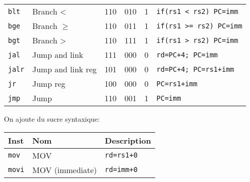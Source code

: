 \documentclass[a4paper]{article}
\begin{document}
\begin{longtable}{|l|l|c|c|c|l|}
        \texttt{blt}   & Branch <                        & 110    & 010    & 1      & \texttt{if(rs1 < rs2) PC=imm} \\
        \texttt{bge}   & Branch \(\geqslant\)            & 110    & 011    & 1      & \texttt{if(rs1 >= rs2) PC=imm}\\
        \texttt{bgt}   & Branch >                        & 110    & 111    & 1      & \texttt{if(rs1 > rs2) PC=imm} \\
        \hline
        \texttt{jal}   & Jump and link                   & 111    & 000    & 0      &\texttt{rd=PC+4; PC=imm}         \\
        \texttt{jalr}  & Jump and link reg               & 101    & 000    & 0      &\texttt{rd=PC+4; PC=rs1+imm}     \\
        \texttt{jr}    & Jump reg                        & 100    & 000    & 0      &\texttt{PC=rs1+imm}            \\
        \texttt{jmp}   & Jump                            & 110    & 001    & 1      &\texttt{PC=imm}                \\
        \hline
    \end{longtable}

    On ajoute du sucre syntaxique:

    \begin{longtable}{|l|l|l|}
        \hline
        Inst          & Nom             & Description       \\
        \hline
        \texttt{mov}  & MOV             & \texttt{rd=rs1+0} \\
        \texttt{movi} & MOV (immediate) & \texttt{rd=imm+0} \\
        \hline
    \end{longtable}
\end{document}
